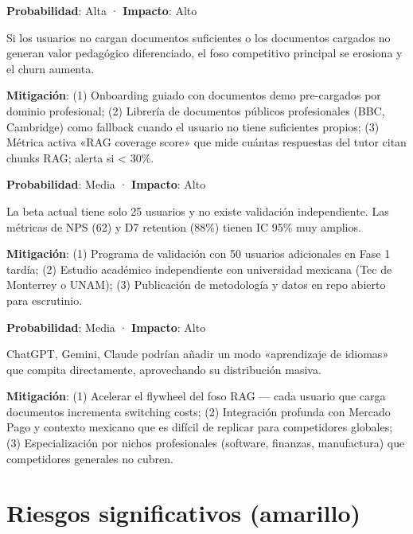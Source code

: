 \documentclass[10pt,a4paper,oneside]{report}
\begin{document}
\begin{tcolorbox}[warnbox,title=R2 — Churn por contenido RAG insuficiente]
\textbf{Probabilidad}: Alta · \textbf{Impacto}: Alto

Si los usuarios no cargan documentos suficientes o los documentos cargados no generan valor pedagógico diferenciado, el foso competitivo principal se erosiona y el churn aumenta.

\textbf{Mitigación}: (1) Onboarding guiado con documentos demo pre-cargados por dominio profesional; (2) Librería de documentos públicos profesionales (BBC, Cambridge) como fallback cuando el usuario no tiene suficientes propios; (3) Métrica activa «RAG coverage score» que mide cuántas respuestas del tutor citan chunks RAG; alerta si < 30\%.
\end{tcolorbox}

\begin{tcolorbox}[warnbox,title=R5 — Validación débil]
\textbf{Probabilidad}: Media · \textbf{Impacto}: Alto

La beta actual tiene solo 25 usuarios y no existe validación independiente. Las métricas de NPS (62) y D7 retention (88\%) tienen IC 95\% muy amplios.

\textbf{Mitigación}: (1) Programa de validación con 50 usuarios adicionales en Fase 1 tardía; (2) Estudio académico independiente con universidad mexicana (Tec de Monterrey o UNAM); (3) Publicación de metodología y datos en repo abierto para escrutinio.
\end{tcolorbox}

\begin{tcolorbox}[warnbox,title=R7 — Competidor genérico de bajo costo]
\textbf{Probabilidad}: Media · \textbf{Impacto}: Alto

ChatGPT, Gemini, Claude podrían añadir un modo «aprendizaje de idiomas» que compita directamente, aprovechando su distribución masiva.

\textbf{Mitigación}: (1) Acelerar el flywheel del foso RAG — cada usuario que carga documentos incrementa switching costs; (2) Integración profunda con Mercado Pago y contexto mexicano que es difícil de replicar para competidores globales; (3) Especialización por nichos profesionales (software, finanzas, manufactura) que competidores generales no cubren.
\end{tcolorbox}

\section{Riesgos significativos (amarillo)}
\end{document}
